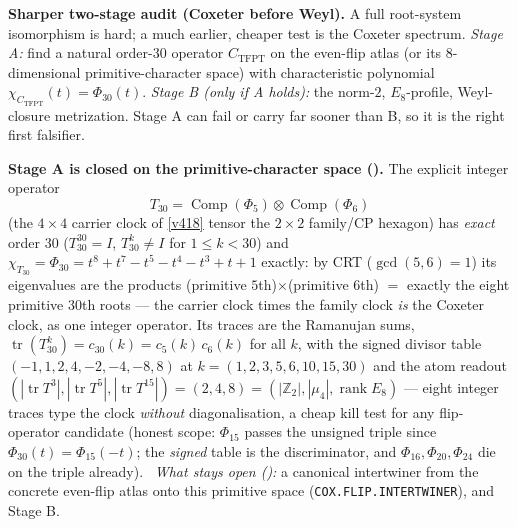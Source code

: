 \documentclass[11pt,a4paper]{article}
\newcommand{\Z}{\mathbb{Z}}
\theoremstyle{definition}
\begin{document}
\noindent\textbf{Sharper two-stage audit (Coxeter before Weyl).} A full root-system isomorphism is
hard; a much earlier, cheaper test is the Coxeter spectrum. \emph{Stage A:} find a natural order-$30$
operator $C_{\mathrm{TFPT}}$ on the even-flip atlas (or its $8$-dimensional primitive-character space)
with characteristic polynomial $\chi_{C_{\mathrm{TFPT}}}(t)=\Phi_{30}(t)$. \emph{Stage B (only if A
holds):} the norm-$2$, $E_8$-profile, Weyl-closure metrization. Stage A can fail or carry far sooner
than B, so it is the right first falsifier.
\par\smallskip\noindent\textbf{Stage A is closed on the primitive-character space
().} The explicit integer operator
\[
  T_{30}=\operatorname{Comp}(\Phi_5)\otimes\operatorname{Comp}(\Phi_6)
\]
(the $4{\times}4$ carrier clock of \vref{v418} tensor the $2{\times}2$ family/CP hexagon) has \emph{exact}
order $30$ ($T_{30}^{30}=I$, $T_{30}^k\neq I$ for $1\le k<30$) and
$\chi_{T_{30}}=\Phi_{30}=t^8+t^7-t^5-t^4-t^3+t+1$ exactly: by CRT ($\gcd(5,6)=1$) its eigenvalues are the
products (primitive $5$th)$\times$(primitive $6$th) $=$ exactly the eight primitive $30$th roots --- the
carrier clock times the family clock \emph{is} the Coxeter clock, as one integer operator. Its traces are
the Ramanujan sums, $\operatorname{tr}(T_{30}^k)=c_{30}(k)=c_5(k)\,c_6(k)$ for all $k$, with the signed
divisor table $(-1,1,2,4,-2,-4,-8,8)$ at $k=(1,2,3,5,6,10,15,30)$ and the atom readout
$(|\operatorname{tr}T^3|,|\operatorname{tr}T^5|,|\operatorname{tr}T^{15}|)=(2,4,8)
=(|\Z_2|,|\mu_4|,\operatorname{rank}E_8)$ --- eight integer traces type the clock \emph{without}
diagonalisation, a cheap kill test for any flip-operator candidate (honest scope: $\Phi_{15}$ passes the
unsigned triple since $\Phi_{30}(t)=\Phi_{15}(-t)$; the \emph{signed} table is the discriminator, and
$\Phi_{16},\Phi_{20},\Phi_{24}$ die on the triple already). \mE\ \emph{What stays open (\mO):} a canonical
intertwiner from the concrete even-flip atlas onto this primitive space
(\texttt{COX.FLIP.INTERTWINER}), and Stage B.
\end{document}
